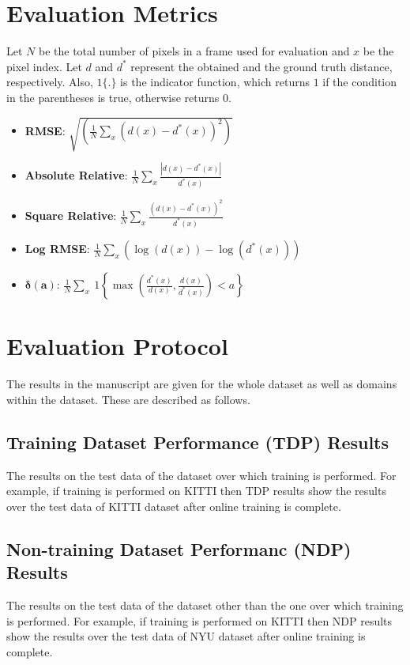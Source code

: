 \documentclass[lettersize,journal]{IEEEtran}
\begin{document}
 \section{Evaluation Metrics}
 Let $N$ be the total number of pixels in a frame used for evaluation and $x$ be the pixel index. Let $d$ and $d^*$ represent the obtained and the ground truth distance, respectively. Also, $1\{.\}$ is the indicator function, which returns $1$ if the condition in the parentheses is true, otherwise returns $0$.
 
 \begin{itemize} 
    \item \textbf{RMSE}: $\sqrt{\left(\frac{1}{N}\sum_x(d(x) - d^*(x))^2\right)}$
    \item \textbf{Absolute Relative}: $\frac{1}{N}\sum_x\frac{\left|d(x) - d^*(x)\right|}{d^*(x)}$
    \item \textbf{Square Relative}: $\frac{1}{N}\sum_x\frac{(d(x) - d^*(x))^2}{d^*(x)}$
    \item \textbf{Log RMSE}: $\frac{1}{N}\sum_x(\log(d(x)) - \log(d^*(x)))$
    \item $\boldsymbol{\delta(a)}$: $\frac{1}{N}\sum_x~1\left\{\max\left(\frac{d^*(x)}{d(x)}, \frac{d(x)}{d^*(x)}\right) < a\right\}$
 \end{itemize}
 
 \section{Evaluation Protocol}
 The results in the manuscript are given for the whole dataset as well as domains within the dataset. These are described as follows. 
 
 \subsection{Training Dataset Performance (TDP) Results}
 The results on the test data of the dataset over which training is performed. For example, if training is performed on KITTI then TDP results show the results over the test data of KITTI dataset after online training is complete. 
 
 \subsection{Non-training Dataset Performanc (NDP) Results}
 The results on the test data of the dataset other than the one over which training is performed. For example, if training is performed on KITTI then NDP results show the results over the test data of NYU dataset after online training is complete.
 
\end{document}
